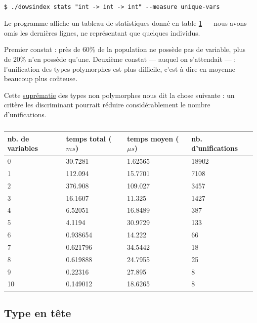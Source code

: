 \documentclass[a4paper]{report}
\theoremstyle{definition}
\newcommand\gab[1]{{\bf\color{Orange}{TODO: #1}}\\}
\newcommand\reformule[1]{\underline{#1}}
\begin{document}
\gab{il faut dire/répéter que contient la bdd qu'on utilise}
\begin{verbatim}
$ ./dowsindex stats "int -> int -> int" --measure unique-vars
\end{verbatim}

Le programme affiche un tableau de statistiques donné en table \ref{tab_meas1} — nous avons omis les dernières lignes, ne représentant que quelques individus.

Premier constat : près de 60\% de la population ne possède pas de variable, plus de 20\% n'en possède qu'une. Deuxième constat — auquel on s'attendait — : l'unification des types polymorphes est plus difficile, c'est-à-dire en moyenne beaucoup plus coûteuse.

Cette \reformule{suprématie} des types non polymorphes nous dit la chose suivante : un critère les discriminant pourrait réduire considérablement le nombre d'unifications.

\begin{table}[h]
  \centering
  \begin{tabular}{|l|l|l|l|}
    \hline
      nb. de variables &
      temps total ($ms$) &
      temps moyen ($\mu s$) &
      nb. d'unifications
    \\
    \hline
      0 & 30.7281 & 1.62565 & 18902
    \\
      1 & 112.094 & 15.7701 & 7108
    \\
      2 & 376.908 & 109.027 & 3457
    \\
      3 & 16.1607 & 11.325 & 1427
    \\
      4 & 6.52051 & 16.8489 & 387
    \\
      5 & 4.1194 & 30.9729 & 133
    \\
      6 & 0.938654 & 14.222 & 66
    \\
      7 & 0.621796 & 34.5442 & 18
    \\
      8 & 0.619888 & 24.7955 & 25
    \\
      9 & 0.22316 & 27.895 & 8
    \\
      10 & 0.149012 & 18.6265 & 8
    \\
    \hline
  \end{tabular}
  \caption{\label{tab_meas1}}
\end{table}


\subsection{Type en tête}
\end{document}
